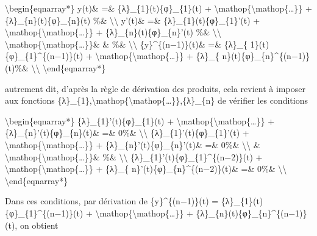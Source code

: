 \documentclass[]{article}
\begin{document}
\textbackslash{}begin\{eqnarray*\} y(t)\& =\&
\{λ\}\_\{1\}(t)\{φ\}\_\{1\}(t) +
\textbackslash{}mathop\{\textbackslash{}mathop\{\ldots{}\}\} +
\{λ\}\_\{n\}(t)\{φ\}\_\{n\}(t) \%\& \textbackslash{}\textbackslash{}
y'(t)\& =\& \{λ\}\_\{1\}(t)\{φ\}\_\{1\}'(t) +
\textbackslash{}mathop\{\textbackslash{}mathop\{\ldots{}\}\} +
\{λ\}\_\{n\}(t)\{φ\}\_\{n\}'(t) \%\& \textbackslash{}\textbackslash{}
\textbackslash{}mathop\{\textbackslash{}mathop\{\ldots{}\}\}\& \& \%\&
\textbackslash{}\textbackslash{} \{y\}\^{}\{(n−1)\}(t)\& =\& \{λ\}\_\{
1\}(t)\{φ\}\_\{1\}\^{}\{(n−1)\}(t) +
\textbackslash{}mathop\{\textbackslash{}mathop\{\ldots{}\}\} + \{λ\}\_\{
n\}(t)\{φ\}\_\{n\}\^{}\{(n−1)\}(t)\%\& \textbackslash{}\textbackslash{}
\textbackslash{}end\{eqnarray*\}

autrement dit, d'après la règle de dérivation des produits, cela revient
à imposer aux fonctions
\{λ\}\_\{1\},\textbackslash{}mathop\{\textbackslash{}mathop\{\ldots{}\}\},\{λ\}\_\{n\}
de vérifier les conditions

\textbackslash{}begin\{eqnarray*\} \{λ\}\_\{1\}'(t)\{φ\}\_\{1\}(t) +
\textbackslash{}mathop\{\textbackslash{}mathop\{\ldots{}\}\} +
\{λ\}\_\{n\}'(t)\{φ\}\_\{n\}(t)\& =\& 0\%\&
\textbackslash{}\textbackslash{} \{λ\}\_\{1\}'(t)\{φ\}\_\{1\}'(t) +
\textbackslash{}mathop\{\textbackslash{}mathop\{\ldots{}\}\} +
\{λ\}\_\{n\}'(t)\{φ\}\_\{n\}'(t)\& =\& 0\%\&
\textbackslash{}\textbackslash{} \&
\textbackslash{}mathop\{\textbackslash{}mathop\{\ldots{}\}\}\& \%\&
\textbackslash{}\textbackslash{}
\{λ\}\_\{1\}'(t)\{φ\}\_\{1\}\^{}\{(n−2)\}(t) +
\textbackslash{}mathop\{\textbackslash{}mathop\{\ldots{}\}\} + \{λ\}\_\{
n\}'(t)\{φ\}\_\{n\}\^{}\{(n−2)\}(t)\& =\& 0\%\&
\textbackslash{}\textbackslash{} \textbackslash{}end\{eqnarray*\}

Dans ces conditions, par dérivation de \{y\}\^{}\{(n−1)\}(t) =
\{λ\}\_\{1\}(t)\{φ\}\_\{1\}\^{}\{(n−1)\}(t) +
\textbackslash{}mathop\{\textbackslash{}mathop\{\ldots{}\}\} +
\{λ\}\_\{n\}(t)\{φ\}\_\{n\}\^{}\{(n−1)\}(t), on obtient
\end{document}
